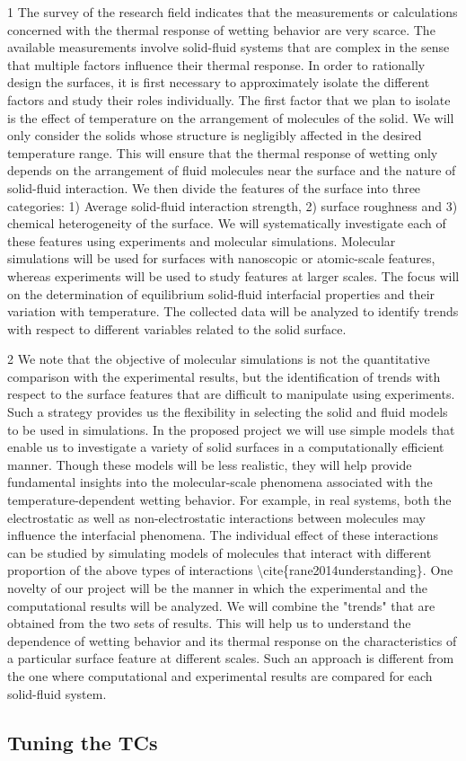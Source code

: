 \par 1 The survey of the research field indicates that the measurements or calculations concerned with the thermal response of wetting behavior are very scarce. The available measurements involve solid-fluid systems that are complex in the sense that multiple factors influence their thermal response. In order to rationally design the surfaces, it is first necessary to approximately isolate the different factors and study their roles individually. The first factor that we plan to isolate is the effect of temperature on the arrangement of molecules of the solid. We will only consider the solids whose structure is negligibly affected in the desired temperature range. This will ensure that the thermal response of wetting only depends on the arrangement of fluid molecules near the surface and the nature of solid-fluid interaction. We then divide the features of the surface into three categories: 1) Average solid-fluid interaction strength, 2) surface roughness and 3) chemical heterogeneity of the surface. We will systematically investigate each of these features using experiments and molecular simulations. Molecular simulations will be used for surfaces with nanoscopic or atomic-scale features, whereas experiments will be used to study features at larger scales. The focus will on the determination of equilibrium solid-fluid interfacial properties and their variation with temperature. The collected data will be analyzed to identify trends with respect to different variables related to the solid surface.
\par 2 We note that the objective of molecular simulations is not the quantitative comparison with the experimental results, but the identification of trends with respect to the surface features that are difficult to manipulate using experiments. Such a strategy provides us the flexibility in selecting the solid and fluid models to be used in simulations. In the proposed project we will use simple models that enable us to investigate a variety of solid surfaces in a computationally efficient manner. Though these models will be less realistic, they will help provide fundamental insights into the molecular-scale phenomena associated with the temperature-dependent wetting behavior. For example, in real systems, both the electrostatic as well as non-electrostatic interactions between molecules may influence the interfacial phenomena. The individual effect of these interactions can be studied by simulating models of molecules that interact with different proportion of the above types of interactions \textbackslash cite\{rane2014understanding\}. One novelty of our project will be the manner in which the experimental and the computational results will be analyzed. We will combine the "trends" that are obtained from the two sets of results. This will help us to understand the dependence of wetting behavior and its thermal response on the characteristics of a particular surface feature at different scales. Such an approach is different from the one where computational and experimental results are compared for each solid-fluid system.\subsection{Tuning the TCs}


